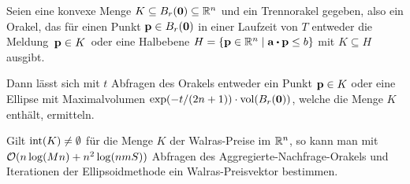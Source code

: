 \begin{theorem}
Seien eine konvexe Menge $K\subseteq B_r(\mathbf{0})\subseteq \mathbb{R}^n$ und ein Trennorakel gegeben, also ein Orakel, das für einen Punkt $\mathbf{p}\in B_r(\mathbf{0})$ in einer Lauf\-zeit von $T$ entweder die Meldung \glqq\,$\mathbf{p}\in K$\grqq\ oder eine Halbebene $H=\{ \fp \in\R^n \mid \fa \bcdot \fp \leq b \}$ mit $K\subseteq H$ ausgibt.

Dann lässt sich mit $t$ Abfragen des Orakels entweder ein Punkt $\mathbf{p}\in K$ oder eine Ellipse mit Maximalvolumen $\operatorname{exp}({-t / ({2n + 1}})) \cdot \operatorname{vol}(B_r(\mathbf{0}))$, welche die Menge $K$ enthält, ermitteln.
\end{theorem}
\begin{theorem}
	Gilt $\operatorname{int}(K) \neq \emptyset$ für die Menge $K$ der Walras-Preise im $\mathbb{R}^n$, so kann man mit $\mathcal{O}(n\log(Mn) + n^2 \log(n m S))$ Abfragen des Aggregierte-Nachfrage-Orakels und Iterationen der Ellipsoidmethode ein Walras-Preisvektor bestimmen.
\end{theorem}
